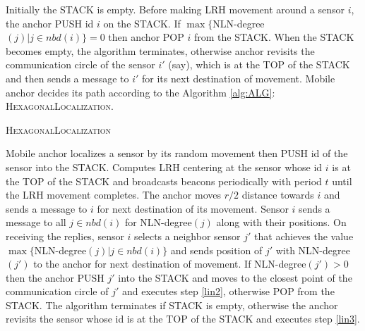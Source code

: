 \documentclass[preprint,11pt]{elsarticle}
\begin{document}
Initially the STACK is empty. Before making LRH movement around a sensor $i$, the anchor PUSH id $i$ on the STACK. If $\max\{$NLN-degree$(j) | j\in nbd(i)\}=0$ then anchor POP $i$ from the STACK. When the STACK becomes empty, the algorithm terminates, otherwise anchor revisits the communication circle of the sensor $i'$ (say), which is at the TOP of the STACK and then sends a message to $i'$ for its next destination of movement.
Mobile anchor decides its path according to the Algorithm \ref{alg:ALG}: \textsc{HexagonalLocalization}.
\begin{algorithm}[]
\caption{\textsc{HexagonalLocalization}}
\begin{algorithmic}[1]
                    \STATE Mobile anchor localizes a sensor by its random movement then PUSH id of the sensor into the STACK.
                    \STATE \label{lin2} Computes LRH centering at the sensor whose id $i$ is at the TOP of the STACK and broadcasts beacons periodically with period $t$ until the LRH movement completes.
                    \STATE \label{lin3} The anchor moves $r/2$ distance towards $i$ and sends a message to $i$ for next destination of its movement.
                    \STATE Sensor $i$ sends a message to all $j\in nbd(i)$ for NLN-degree$(j)$ along with their positions.
                    \STATE On receiving the replies, sensor $i$ selects
                        a neighbor sensor $j'$ that achieves the value $\max\{$NLN-degree$(j) | j\in nbd(i)\}$ and sends position of $j'$ with NLN-degree$(j')$ to the anchor for next destination of movement.
                    \STATE If NLN-degree$(j')>0$ then the anchor PUSH $j'$ into the STACK and moves to the closest point of the communication circle of $j'$ and executes step \ref{lin2}, otherwise POP from the STACK.
                    \STATE The algorithm terminates if STACK is empty, otherwise the anchor revisits the sensor whose id is at the TOP of the STACK and executes step \ref{lin3}.
\end{algorithmic}
\label{alg:ALG}
\end{algorithm}
\end{document}
